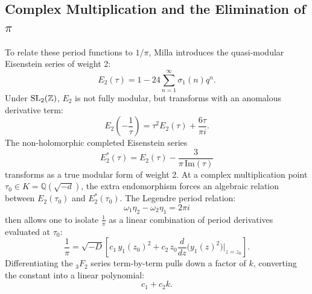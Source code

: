 \documentclass[a4paper]{article}
\begin{document}
\subsection{Complex Multiplication and the Elimination of \texorpdfstring{$\pi$}{pi}}
To relate these period functions to $1/\pi$, Milla introduces the quasi-modular Eisenstein series of weight 2:
\begin{equation}
 E_2(\tau) = 1 - 24 \sum_{n=1}^\infty \sigma_1(n) q^n.
\end{equation}
Under $\mathrm{SL}_2(\mathbb{Z})$, $E_2$ is not fully modular, but transforms with an anomalous derivative term:
\begin{equation}
 E_2\left(-\frac{1}{\tau}\right) = \tau^2 E_2(\tau) + \frac{6\tau}{\pi i}.
\end{equation}
The non-holomorphic completed Eisenstein series
\begin{equation}
 E_2^*(\tau) = E_2(\tau) - \frac{3}{\pi \, \mathrm{Im}(\tau)}
\end{equation}
transforms as a true modular form of weight 2.
At a complex multiplication point $\tau_0 \in K = \mathbb{Q}(\sqrt{-d})$, the extra endomorphism forces an algebraic relation between $E_2(\tau_0)$ and $E_2^*(\tau_0)$. The Legendre period relation:
\begin{equation}
 \omega_1 \eta_2 - \omega_2 \eta_1 = 2\pi i
\end{equation}
then allows one to isolate $\frac{1}{\pi}$ as a linear combination of period derivatives evaluated at $\tau_0$:
\begin{equation}
 \frac{1}{\pi} = \sqrt{-D} \left[ c_1 \, y_1(z_0)^2 + c_2 \, z_0 \frac{d}{dz}\Big(y_1(z)^2\Big)\Big|_{z = z_0} \right].
\end{equation}
Differentiating the ${_3F_2}$ series term-by-term pulls down a factor of $k$, converting the constant into a linear polynomial:
\begin{equation}
 c_1 + c_2 k.
\end{equation}
\end{document}
